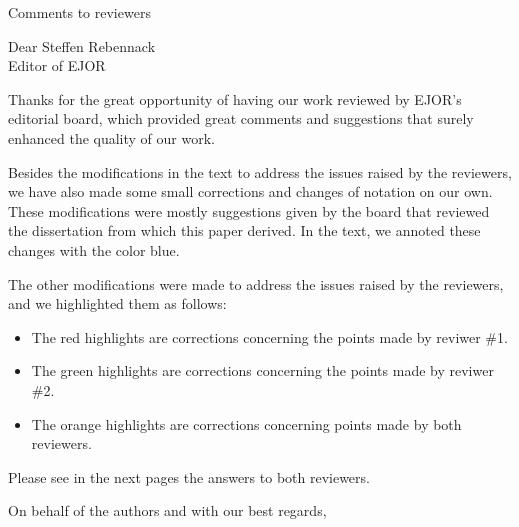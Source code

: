 \documentclass[letterpaper]{letter}
\begin{document}
\begin{letter}{Comments to reviewers}
			\opening{Dear Steffen Rebennack\\Editor of EJOR}
			
			Thanks for the great opportunity of having our work reviewed by EJOR's editorial board, which provided great comments and suggestions that surely enhanced the quality of our work. 
			
			Besides the modifications in the text to address the issues raised by the reviewers, we have also made some small corrections and changes of notation on our own. These modifications were mostly suggestions given by the board that reviewed the dissertation from which this paper derived. In the text, we annoted these changes with the color {\color{blue}blue}.
			
			The other modifications were made to address the issues raised by the reviewers, and we highlighted them as follows:
			
			\begin{itemize}
				\item The {\color{Red} red} highlights are corrections concerning the points made by reviwer \#1.
				
				\item The {\color{Green} green} highlights are corrections concerning the points made by reviwer \#2.
				
				\item The {\color{Orange} orange} highlights are corrections concerning points made by both reviewers.
			\end{itemize}
			
			Please see in the next pages the answers to both reviewers.
			
			\closing{On behalf of the authors and with our best regards,}
\end{letter}
	
	
	
\end{document}
